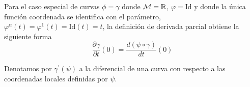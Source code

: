 Para el caso especial de curvas $\phi=\gamma$ donde $\mathcal{M}=\mathbb{R}$, $\varphi=\text{Id}$ y donde la única función
coordenada se identifica con el parámetro, $\varphi^\alpha(t)=\varphi^1(t)=\text{Id}(t)=t$, la definición de derivada
parcial obtiene la siguiente forma
\begin{equation}\label{eq:derivada-parcial-curva}
\frac{\partial\gamma}{\partial t}(0)=\frac{d(\psi\circ\gamma)}{dt}(0)
\end{equation}

\begin{notation}
  Denotamos por $\gamma^{'}(\psi)$ a la diferencial de una curva con
  respecto a las coordenadas locales definidas por $\psi$.
\end{notation}